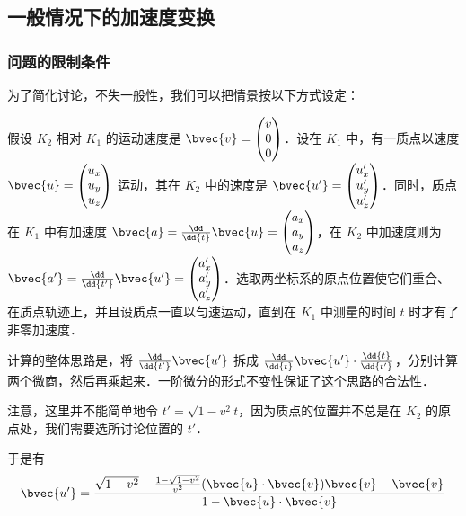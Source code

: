 

\subsection{一般情况下的加速度变换}
\subsubsection{问题的限制条件}

为了简化讨论，不失一般性，我们可以把情景按以下方式设定：

假设 $K_2$ 相对 $K_1$ 的运动速度是 $\bvec{v}=\left(\begin{matrix}v\\0\\0\end{matrix} \right) $．设在 $K_1$ 中，有一质点以速度 $\bvec{u}=\left(\begin{matrix}u_x\\u_y\\u_z\end{matrix} \right)$ 运动，其在 $K_2$ 中的速度是 $\bvec{u'}=\left(\begin{matrix}u_x'\\u_y'\\u_z'\end{matrix} \right) $．同时，质点在 $K_1$ 中有加速度 $\bvec{a}=\frac{\dd}{\dd{t}}\bvec{u}=\left(\begin{matrix}a_x\\a_y\\a_z\end{matrix} \right)$，在 $K_2$ 中加速度则为 $\bvec{a'}=\frac{\dd}{\dd{t'}}\bvec{u'}=\left(\begin{matrix}a_x'\\a_y'\\a_z'\end{matrix} \right)$．选取两坐标系的原点位置使它们重合、在质点轨迹上，并且设质点一直以匀速运动，直到在 $K_1$ 中测量的时间 $t$ 时才有了非零加速度．

计算的整体思路是，将 $\frac{\dd}{\dd{t'}}\bvec{u'}$ 拆成 $\frac{\dd}{\dd{t}}\bvec{u'}\cdot\frac{\dd{t}}{\dd{t'}}$，分别计算两个微商，然后再乘起来．一阶微分的形式不变性保证了这个思路的合法性．

注意，这里并不能简单地令 $t'=\sqrt{1-v^2}t$，因为质点的位置并不总是在 $K_2$ 的原点处，我们需要选所讨论位置的 $t'$．

于是有
\begin{equation}\label{SRAcc_eq2}
\bvec{u'}=\frac{\sqrt{1-v^2}-\frac{1-\sqrt{1-v^2}}{v^2}(\bvec{u}\cdot\bvec{v})\bvec{v}-\bvec{v}}{1-\bvec{u}\cdot\bvec{v}}
\end{equation}

